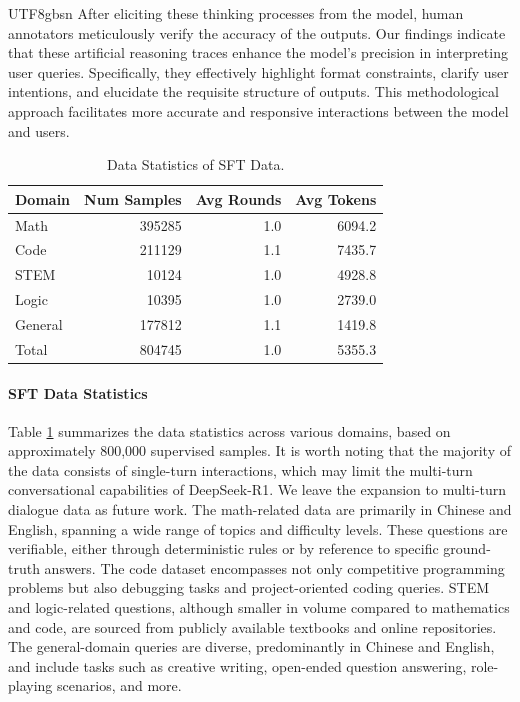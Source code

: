 \documentclass[11pt, a4paper, logo, copyright, nonumbering]{deepseek}
\newcommand{\dsri}{DeepSeek-R1}
\begin{document}
\begin{CJK*}{UTF8}{gbsn}
After eliciting these thinking processes from the model, human annotators meticulously verify the accuracy of the outputs. Our findings indicate that these artificial reasoning traces enhance the model's precision in interpreting user queries. Specifically, they effectively highlight format constraints, clarify user intentions, and elucidate the requisite structure of outputs. This methodological approach facilitates more accurate and responsive interactions between the model and users.

\begin{table}[ht]
\centering
\caption{Data Statistics of SFT Data.}
\label{tab:800k}
\begin{tabular}{lrrr}
\toprule
{Domain} & {Num Samples} & {Avg Rounds} & {Avg Tokens} \\
\midrule
Math & 395285 & 1.0 & 6094.2 \\
Code & 211129 & 1.1 & 7435.7 \\
STEM & 10124 & 1.0 & 4928.8 \\
Logic & 10395 & 1.0 & 2739.0 \\
General & 177812 & 1.1 & 1419.8 \\
\midrule
Total & 804745 & 1.0 & 5355.3 \\
\bottomrule
\end{tabular}
\end{table}
\paragraph{SFT Data Statistics}
Table \ref{tab:800k} summarizes the data statistics across various domains, based on approximately 800,000 supervised samples. It is worth noting that the majority of the data consists of single-turn interactions, which may limit the multi-turn conversational capabilities of \dsri{}. We leave the expansion to multi-turn dialogue data as future work. The math-related data are primarily in Chinese and English, spanning a wide range of topics and difficulty levels. These questions are verifiable, either through deterministic rules or by reference to specific ground-truth answers. The code dataset encompasses not only competitive programming problems but also debugging tasks and project-oriented coding queries. STEM and logic-related questions, although smaller in volume compared to mathematics and code, are sourced from publicly available textbooks and online repositories. The general-domain queries are diverse, predominantly in Chinese and English, and include tasks such as creative writing, open-ended question answering, role-playing scenarios, and more.


\end{CJK*}
\end{document}
